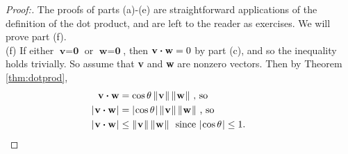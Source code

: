 \begin{proofbar}\vspace{-3mm}\begin{proof}[Proof:]
 The proofs of parts (a)-(e) are straightforward applications of the definition of the dot product, and are left
 to the reader as exercises. We will prove part (f).\\(f)
 If either $\textbf{v} = \textbf{0}$ or $\textbf{w} = \textbf{0}$, then $\textbf{v} \bm{\cdot} \textbf{w} = 0$
 by part (c), and so the inequality holds trivially. So assume that \textbf{v} and \textbf{w} are nonzero vectors. Then
 by Theorem \ref{thm:dotprod},
 \begin{align*}
  \textbf{v} \bm{\cdot} \textbf{w} &= \cos \theta \, \lVert\mspace{1mu}\textbf{v}\mspace{1mu}\rVert\,\lVert\mspace{1mu}\textbf{w}\mspace{1mu}\rVert \text{~,~so}\\
  \lvert\mspace{1mu}\textbf{v} \bm{\cdot} \textbf{w}\mspace{1mu}\rvert &= \lvert\mspace{1mu}\cos \theta\mspace{1mu}\rvert \, \lVert\mspace{1mu}\textbf{v}\mspace{1mu}\rVert\,\lVert\mspace{1mu}\textbf{w}\mspace{1mu}\rVert \text{~,~so}\\
  \lvert\mspace{1mu}\textbf{v} \bm{\cdot} \textbf{w}\mspace{1mu}\rvert &\le \lVert\mspace{1mu}\textbf{v}\mspace{1mu}\rVert\,\lVert\mspace{1mu}\textbf{w}\mspace{1mu}\rVert
   \text{~~since $\lvert\mspace{1mu}\cos \theta\mspace{1mu}\rvert \le 1$. \qquad \qedhere}
 \end{align*}
\end{proof}\vspace{-3mm}\end{proofbar}

